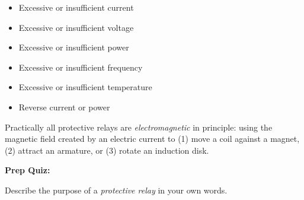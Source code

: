 \begin{itemize}
\item{} Excessive or insufficient current
\item{} Excessive or insufficient voltage
\item{} Excessive or insufficient power
\item{} Excessive or insufficient frequency
\item{} Excessive or insufficient temperature
\item{} Reverse current or power
\end{itemize}

\vskip 10pt

Practically all protective relays are {\it electromagnetic} in principle: using the magnetic field created by an electric current to (1) move a coil against a magnet, (2) attract an armature, or (3) rotate an induction disk.









\vfil \eject

\noindent
{\bf Prep Quiz:}

Describe the purpose of a {\it protective relay} in your own words.



